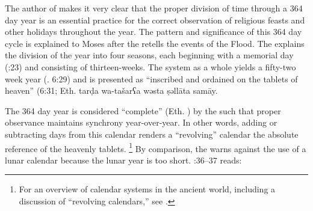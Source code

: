 The author of \jub makes it very clear that the proper division of time through a 364 day year is an essential practice for the correct observation of religious feasts and other holidays throughout the year. The pattern and significance of this 364 day cycle is explained to Moses after the \ap retells the events of the Flood. The \ap explains the division of the year into four seasons, each beginning with a memorial day (:23) and consisting of thirteen-weeks. The system as a whole yields a fifty-two week year (\jub. 6:29) and is presented as ``inscribed and ordained on the tablets of heaven'' (6:31; Eth.
        {tarḍa wa-tašarʕa wəsta ṣəllāta samāy}.

The 364 day year is considered ``complete'' (Eth. ) by the \ap such that proper observance maintains synchrony year-over-year. In other words, adding or subtracting days from this calendar renders a ``revolving'' calendar \visavis the absolute reference of the heavenly tablets.%
    \footnote{For an overview of calendar systems in the ancient world, including a discussion of ``revolving calendars,'' see \cite[214]{glessmer_flint-vanderkam1999}.}
By comparison, the \ap warns against the use of a lunar calendar because the lunar year is too short. :36--37 reads:

